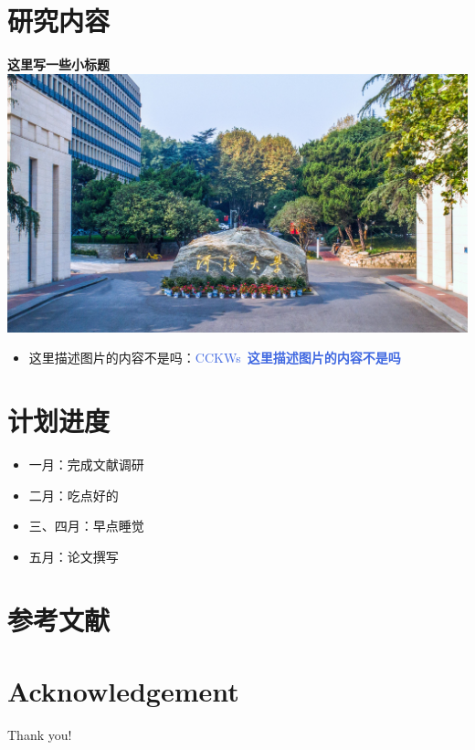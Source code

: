 \documentclass[10pt]{beamer}
\begin{document}
\section{研究内容}
\begin{frame}{\textbf{这里写一些小标题}}
    \centering
    \hspace*{-0.6em}\includegraphics[width=1.05\linewidth]{fig/fengmian.jpg}
    
   
    \begin{itemize}
        \setlength\itemsep{0.5em}
        \setlength\leftmargini{0.1cm}
       \item \hspace*{-0.5em}这里描述图片的内容不是吗：\mbox{\textcolor{RoyalBlue}{CCKWs \textbf{这里描述图片的内容不是吗}}}
    \end{itemize}
\end{frame}



\section{计划进度}
\begin{frame}
    \begin{itemize}
        \item 一月：完成文献调研
        \item 二月：吃点好的
        \item 三、四月：早点睡觉
        \item 五月：论文撰写
    \end{itemize}
\end{frame}

\section{参考文献}

%     
%     



\section*{Acknowledgement}  
\begin{frame}
\textcolor{myNewColorA}{\Huge{\centerline{Thank you!}}}
\end{frame}
\end{document}
